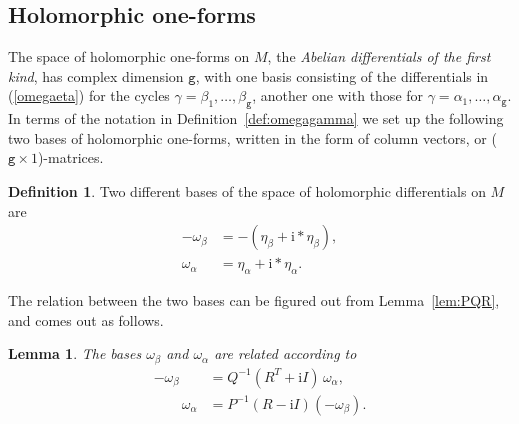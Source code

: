 \documentclass[reqno,12pt]{article}
\theoremstyle{plain}
\newtheorem{lemma}[thm]{Lemma}
\theoremstyle{definition}
\newtheorem{definition}{Definition}[section]
\numberwithin{equation}{section}
\numberwithin{figure}{section}
\def\I{\mathrm{i}}
\begin{document}

\subsection{Holomorphic one-forms}\label{sec:capacity matrices}

The space of holomorphic one-forms on $M$, the {\it Abelian differentials of the first kind},
has complex dimension $\texttt{g}$, with one basis consisting of the differentials in (\ref{omegaeta})
for the cycles $\gamma=\beta_1,\dots, \beta_{\texttt{g}}$, another one with those for
$\gamma=\alpha_1,\dots,\alpha_\texttt{g}$. 
In terms of the notation in Definition~\ref{def:omegagamma} we set up the following two bases
of holomorphic one-forms, written in the form of column vectors, or  ($\texttt{g}\times 1$)-matrices.
\begin{definition} 
Two different bases of the space of holomorphic differentials on $M$ are
\begin{align}\label{omegabeta} 
-\omega_\beta&=-(\eta_\beta+\I*\eta_\beta),\\
\label{omegaalpha}
\omega_\alpha&=\eta_\alpha+\I *\eta_\alpha.
\end{align}
\end{definition}

The relation between the two bases can be figured out from Lemma~\ref{lem:PQR}, and comes out as follows. 
\begin{lemma}\label{lem:UQRU}
The bases $\omega_\beta$ and $\omega_\alpha$ are related according to
\begin{align*}
-\omega_\beta&=Q^{-1}(R^T+\I I )\,\omega_\alpha,\\
\qquad\omega_\alpha&=P^{-1}(R-\I I)(-\omega_\beta).
\end{align*}
\end{lemma}
\end{document}
